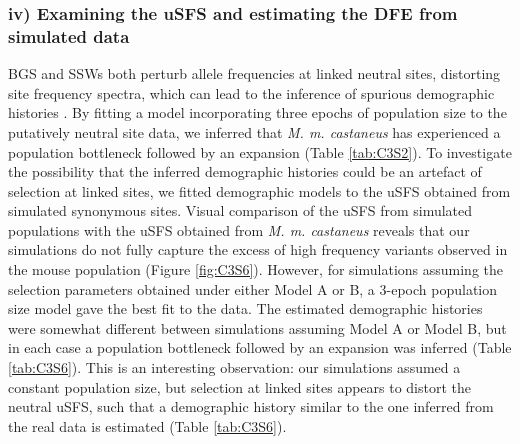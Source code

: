 \subsubsection{iv) Examining the uSFS and estimating the DFE from simulated data}

	BGS and SSWs both perturb allele frequencies at linked neutral sites, distorting site frequency spectra, which can lead to the inference of spurious demographic histories \citep{RN149, RN241, RN242}. By fitting a model incorporating three epochs of population size to the putatively neutral site data, we inferred that \textit{M. m. castaneus} has experienced a population bottleneck followed by an expansion (Table \ref{tab:C3S2}). To investigate the possibility that the inferred demographic histories could be an artefact of selection at linked sites, we fitted demographic models to the uSFS obtained from simulated synonymous sites. Visual comparison of the uSFS from simulated populations with the uSFS obtained from \textit{M. m. castaneus} reveals that our simulations do not fully capture the excess of high frequency variants observed in the mouse population (Figure \ref{fig:C3S6}). However, for simulations assuming the selection parameters obtained under either Model A or B, a 3-epoch population size model gave the best fit to the data. The estimated demographic histories were somewhat different between simulations assuming Model A or Model B, but in each case a population bottleneck followed by an expansion was inferred (Table \ref{tab:C3S6}). This is an interesting observation: our simulations assumed a constant population size, but selection at linked sites appears to distort the neutral uSFS, such that a demographic history similar to the one inferred from the real data is estimated (Table \ref{tab:C3S6}).  

